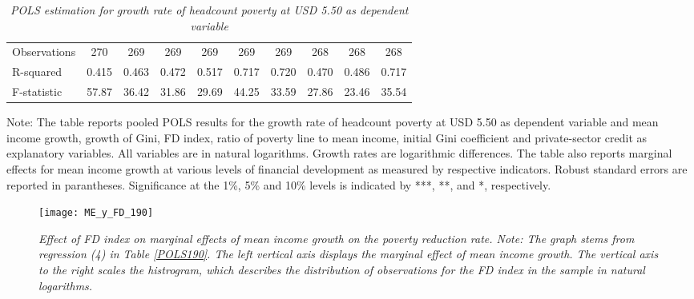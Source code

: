 \documentclass[12pt, a4paper]{article}
\begin{document}
\begin{table}[htbp]
\begin{threeparttable}
{\begin{tabular}{l*{9}{c}}
				\hline
				Observations        &         270         &         269         &         269         &         269         &         269         &         269         &         268         &         268         &         268         \\
				R-squared           &       0.415         &       0.463         &       0.472         &       0.517         &       0.717         &       0.720         &       0.470         &       0.486         &       0.717         \\
				F-statistic         &       57.87         &       36.42         &       31.86         &       29.69         &       44.25         &       33.59         &       27.86         &       23.46         &       35.54         \\
				\hline\hline
			\end{tabular}
		}
		\begin{tablenotes}
			\item \scriptsize{Note: The table reports pooled POLS results for the growth rate of headcount poverty at USD 5.50 as dependent variable and mean income growth, growth of Gini, FD index, ratio of poverty line to mean income, initial Gini coefficient and private-sector credit as explanatory variables. All variables are in natural logarithms. Growth rates are logarithmic differences. The table also reports marginal effects for mean income growth at various levels of financial development as measured by respective indicators. Robust standard errors are reported in parantheses. Significance at the 1\%, 5\% and 10\% levels is indicated by ***, **, and *, respectively.}
		\end{tablenotes}
	\end{threeparttable}
	\caption[POLS Estimation Results for Headcount Poverty at USD 5.50]{\textit{POLS estimation for growth rate of headcount poverty at USD 5.50 as dependent variable}}
	\label{POLS550}
\end{table}

\begin{figure}[htbp]
	\texttt{[image: ME\_y\_FD\_190]}
	\centering
	\caption[Marginal Effect of Mean Income Growth on Poverty Reduction at Given Levels of FD index]{\textit{Effect of FD index on marginal effects of mean income growth on the poverty reduction rate. Note: The graph stems from regression (4) in Table \ref{POLS190}. The left vertical axis displays the marginal effect of mean income growth. The vertical axis to the right scales the histrogram, which describes the distribution of observations for the FD index in the sample in natural logarithms.}}
	\label{fig3}
\end{figure}
\end{document}

